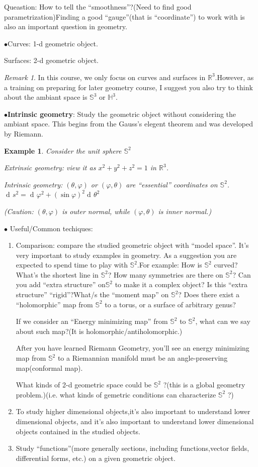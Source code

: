 \documentclass[UTF8,oneside,11pt]{book}
\DeclareMathOperator{\dd}{d\!}
\theoremstyle{plain}\newtheorem{thm}{Theorem}
\theoremstyle{definition}\newtheorem{defn}[thm]{Definition}
\theoremstyle{plain}\newtheorem{axiom}[thm]{Axiom}
\theoremstyle{plain}\newtheorem{coro}[thm]{Corollary}
\theoremstyle{plain}\newtheorem{lemma}[thm]{Lemma}
\theoremstyle{plain}\newtheorem{prop}[thm]{Proposition}
\theoremstyle{plain}\newtheorem{conj}[thm]{Conjecture}
\theoremstyle{plain}\newtheorem{ques}[thm]{Problem}
\theoremstyle{plain}\newtheorem{const}[thm]{Construction}
\theoremstyle{remark}\newtheorem{notation}[thm]{Notation}
\theoremstyle{plain}\newtheorem*{app}{Application}
\theoremstyle{plain}\newtheorem*{exam}{Example}
\theoremstyle{plain}\newtheorem*{exer}{Exercise}
\theoremstyle{remark}\newtheorem*{remark}{Remark}
\theoremstyle{remark}\newtheorem*{note}{\small{Note}}
\numberwithin{equation}{section}
\numberwithin{thm}{section}
\begin{document}
Queastion: How to tell the ``smoothness''?(Need to find good parametrization)Finding a good ``gauge''(that is ``coordinate'') to work with is also an important question in geometry.

$\bullet$Curves: 1-d geometric object.

Surfaces: 2-d geometric object.
\begin{remark}
    In this course, we only focus on curves and surfaces in $\mathbb{R}^3$.However, as a training on preparing for later geometry course, I suggest you also try to think about the ambiant space is $\mathbb{S}^3$ or $\mathbb{H}^3$.

\end{remark}
$\bullet$\textbf{Intrinsic geometry}: Study the geometric object without considering the ambiant space. This begins from the Gauss's elegent theorem and was developed by Riemann.
\begin{exam}
    Consider the unit sphere $\mathbb{S}^2$

    Extrinsic geometry: view it as $x^2+y^2+z^2=1$ in $\mathbb{R}^3$.

    Intrinsic geometry: $(\theta,\varphi)$ or $(\varphi,\theta)$ are ``essential'' coordinates on $\mathbb{S}^2$. $\dd s^2=\dd \varphi^2+(\sin\varphi)^2 \dd\theta^2$

    (Caution: $(\theta,\varphi)$ is outer normal, while $(\varphi,\theta)$ is inner normal.)
\end{exam}
$\bullet$ Useful/Common techiques:
\begin{enumerate}[1)]
    \item Comparison: compare the studied geometric object with ``model space''. It's very important to study examples in geometry. As a suggestion you are expected to spend time to play with $\mathbb{S}^2$.For example: How is $\mathbb{S}^2$ curved? What's the shortest line in $\mathbb{S}^2$? How many symmetries are there on $\mathbb{S}^2$? Can you add ``extra structure'' on$\mathbb{S}^2$ to make it a complex object? Is this ``extra structure'' ``rigid''?What/s the ``moment map'' on $\mathbb{S}^2$? Does there exist a ``holomorphic'' map from $\mathbb{S}^2$ to a torus, or a surface of arbitrary genus? 
 
    If we consider an ``Energy minimizing map'' from $\mathbb{S}^2$ to $\mathbb{S}^2$, what can we say about such map?(It is  holomorphic/antiholomorphic.)
 
    After you have learned Riemann Geometry, you'll see an energy minimizing map from $\mathbb{S}^2$ to a Riemannian manifold must be an angle-preserving map(conformal map).
 
    What kinds of 2-d geometric space could be $\mathbb{S}^2$ ?(this is a global geometry problem.)(i.e. what kinds of gemetric conditions can characterize $\mathbb{S}^2$ ?)
    \item To study higher dimensional objects,it's also important to understand lower dimensional objects, and it's also important to understand lower dimensional objects contained in the studied objects.
    \item Study ``functions''(more generally sections, including functions,vector fields, differential forms, etc.) on a given geometric object.
\end{enumerate}
\end{document}
